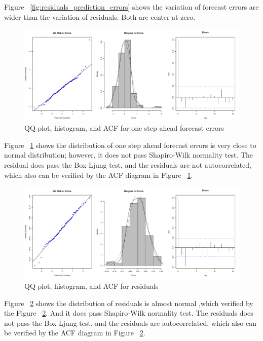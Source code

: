 Figure  ~\ref{fig:residuals_prediction_errors} shows the variation of forecast errors are wider than the variation of residuals. Both are center at zero.  

\begin{figure}
	\centering
	\includegraphics[width=1\linewidth]{Figures/errors3_hist}
	\caption{QQ plot, histogram, and ACF for one step ahead forecast errors}
	\label{fig:errors_hist}
\end{figure}


Figure  ~\ref{fig:errors_hist} shows the distribution of one step ahead forecast errors is very close to normal distribution; however, it does not pass Shapiro-Wilk normality test. The residual does  pass the Box-Ljung test, and the residuals are not autocorrelated, which also can be verified by the ACF diagram in Figure  ~\ref{fig:errors_hist}.    


\begin{figure}
	\centering
	\includegraphics[width=1\linewidth]{Figures/residuals_hist}
	\caption{QQ plot, histogram, and ACF for residuals}
	\label{fig:residuals_hist}
\end{figure}


Figure  ~\ref{fig:residuals_hist} shows the distribution of residuals is almost normal ,which verified by the Figure  ~\ref{fig:residuals_hist}. And it does pass Shapiro-Wilk normality test. The residuals does not pass the Box-Ljung test, and the residuals are autocorrelated, which also can be verified by the ACF diagram in Figure  ~\ref{fig:residuals_hist}.    


